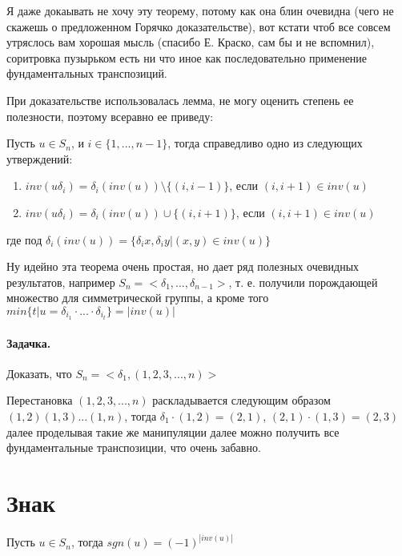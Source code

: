 Я даже докаывать не хочу эту теорему, потому как она блин очевидна (чего не скажешь о предложенном Горячко доказательстве), вот кстати чтоб все совсем утряслось вам хорошая мысль (спасибо Е. Краско, сам бы и не вспомнил), соритровка пузырьком есть ни что иное как последовательно применение фундаментальных транспозиций.

При доказательстве использовалась лемма, не могу оценить степень ее полезности, поэтому всеравно ее приведу:

\begin{Lem}
Пусть $u \in S_n$, и $i \in \{1, ..., n-1\}$, тогда справедливо одно из следующих утверждений:
\begin{enumerate}
\item $inv\left(u \delta_i\right) = \delta_i \left(inv\left(u\right)\right) \setminus \{\left(i, i-1\right)\}$, если $\left(i,i+1\right) \in inv\left(u\right)$

\item $inv\left(u \delta_i\right) = \delta_i \left(inv\left(u\right)\right) \cup \{\left(i,i+1\right)\}$, если $\left(i,i+1\right) \in inv\left(u\right)$
\end{enumerate}

где под $\delta_i \left(inv\left(u\right)\right) = \{\delta_i x, \delta_i y | \left(x,y\right) \in inv\left(u\right)\}$
\end{Lem}

Ну идейно эта теорема очень простая, но дает ряд полезных очевидных результатов, например $S_n = <\delta_1, ... , \delta_{n-1}>$, т. е. получили порождающей множество для симметрической группы, а кроме того $min\{t|u = \delta_{i_1}\cdot ... \cdot \delta_{i_t}\} = \left|inv\left(u\right)\right|$

\paragraph{Задачка.} Доказать, что $S_n = <\delta_1, \left(1, 2, 3, ... , n\right)>$

Перестановка $\left(1, 2, 3, ..., n\right)$ раскладывается следующим образом $\left(1,2\right)\left(1,3\right)...\left(1,n\right)$, тогда $\delta_1 \cdot \left(1,2\right) = \left(2,1\right)$, $\left(2,1\right)\cdot\left(1,3\right) = \left(2,3\right)$ далее проделывая такие же манипуляции далее можно получить все фундаментальные транспозиции, что очень забавно.

\section{Знак}
Пусть $u \in S_n$, тогда $sgn\left(u\right) = \left(-1\right)^{\left|inv\left(u\right)\right|}$

